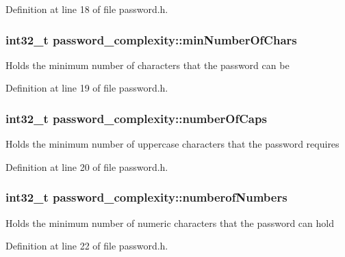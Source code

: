 Definition at line 18 of file password.\+h.

\hypertarget{structpassword__complexity_a4e524a569e1a1e942294bb6bc12c6d0f}{}
\subsubsection[{min\+Number\+Of\+Chars}]{\setlength{\rightskip}{0pt plus 5cm}int32\+\_\+t password\+\_\+complexity\+::min\+Number\+Of\+Chars}\label{structpassword__complexity_a4e524a569e1a1e942294bb6bc12c6d0f}
Holds the minimum number of characters that the password can be 

Definition at line 19 of file password.\+h.

\hypertarget{structpassword__complexity_ab69a60a334bd3dcdd8967bc02b293cd8}{}
\subsubsection[{number\+Of\+Caps}]{\setlength{\rightskip}{0pt plus 5cm}int32\+\_\+t password\+\_\+complexity\+::number\+Of\+Caps}\label{structpassword__complexity_ab69a60a334bd3dcdd8967bc02b293cd8}
Holds the minimum number of uppercase characters that the password requires 

Definition at line 20 of file password.\+h.

\hypertarget{structpassword__complexity_a459b8a5ef8ed7c14e3ce5bb12eefd5a5}{}
\subsubsection[{numberof\+Numbers}]{\setlength{\rightskip}{0pt plus 5cm}int32\+\_\+t password\+\_\+complexity\+::numberof\+Numbers}\label{structpassword__complexity_a459b8a5ef8ed7c14e3ce5bb12eefd5a5}
Holds the minimum number of numeric characters that the password can hold 

Definition at line 22 of file password.\+h.

